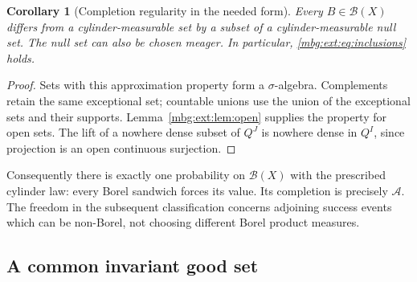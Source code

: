 \documentclass[11pt,letterpaper]{article}
\newtheorem{corollary}[theorem]{Corollary}
\theoremstyle{definition}
\newcommand{\A}{\mathcal A}
\newcommand{\B}{\mathcal B}
\begin{document}
\begin{corollary}[Completion regularity in the needed form]
\label{mbg:ext:cor:borel}
Every $B\in\B(X)$ differs from a cylinder-measurable set by a subset of a cylinder-measurable null set. The null set can also be chosen meager. In particular, \eqref{mbg:ext:eq:inclusions} holds.
\end{corollary}
\begin{proof}
Sets with this approximation property form a $\sigma$-algebra. Complements retain the same exceptional set; countable unions use the union of the exceptional sets and their supports. Lemma~\ref{mbg:ext:lem:open} supplies the property for open sets. The lift of a nowhere dense subset of $Q^J$ is nowhere dense in $Q^I$, since projection is an open continuous surjection.
\end{proof}

Consequently there is exactly one probability on $\B(X)$ with the prescribed cylinder law: every Borel sandwich forces its value. Its completion is precisely $\A$. The freedom in the subsequent classification concerns adjoining success events which can be non-Borel, not choosing different Borel product measures.

\subsection{A common invariant good set}
\end{document}
